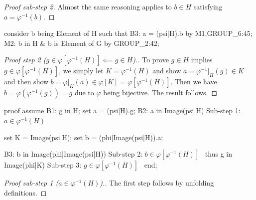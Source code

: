 \begin{proof}[Proof sub-step 2]
Almost the same reasoning applies to $b\in H$ satisfying
$a=\varphi^{-1}(b)$.
\end{proof}

\nwenddocs{}\endmoddef\nwstartdeflinemarkup{}\nwenddeflinemarkup
consider b being Element of H such that
B3: a = (psi|H).b
by M1,GROUP_6:45;
M2: b in H & b is Element of G by GROUP_2:42;
\nwendcode{}\nwdocspar

\begin{proof}[{Proof step 2 ($g\in\varphi[\varphi^{-1}(H)]\impliedby g\in H$)}.]
To prove $g\in H$ implies $g\in\varphi[\varphi^{-1}(H)]$, we simply
let $K=\varphi^{-1}(H)$ and show $a = \varphi^{-1}|_{H}(g)\in K$ and
then show $b=\varphi|_{K}(a)\in\varphi[K]=\varphi[\varphi^{-1}(H)]$. Then
we have $b=\varphi(\varphi^{-1}(g))=g$ due to $\varphi$ being bijective.
The result follows.
\end{proof}

\nwenddocs{}\endmoddef\nwstartdeflinemarkup{}\nwenddeflinemarkup
proof
  assume B1: g in H;
  set a = (psi|H).g;
  B2: a in Image(psi|H)
  \LA{}Sub-step 1: $a\in\varphi^{-1}(H)$~{\nwtagstyle{}}\RA{}

  set K = Image(psi|H);
  set b = (phi|Image(psi|H)).a;

  B3: b in Image(phi|Image(psi|H))
  \LA{}Sub-step 2: $b\in\varphi[\varphi^{-1}(H)]$~{\nwtagstyle{}}\RA{}
  thus g in Image(phi|K)
  \LA{}Sub-step 3: $g\in\varphi[\varphi^{-1}(H)]$~{\nwtagstyle{}}\RA{}
end;
\nwendcode{}\nwdocspar

\begin{proof}[Proof sub-step 1 ($a\in\varphi^{-1}(H)$).]
The first step follows by unfolding definitions.
\end{proof}


